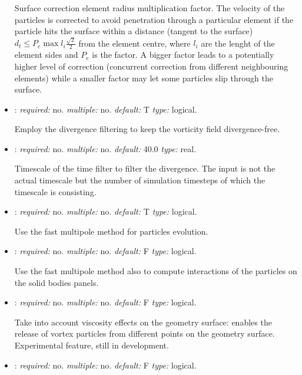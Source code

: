 \begin{itemize}
Surface correction element radius multiplication factor.
The velocity of the particles is corrected to avoid penetration through a 
particular element if the particle hits the surface within a distance 
(tangent to the surface) $d_t \leq P_e \max{l_i} \frac{\sqrt{2}}{2}$ 
from the element centre, where $l_i$ are the lenght of the element sides 
and $P_e$ is the factor. 
A bigger factor leads to a potentially higher level of correction 
(concurrent correction from different neighbouring elements) 
while a smaller factor may let some particles slip through the surface. 

\item {}: \textit{required:} no. \textit{multiple:} no. 
\textit{default:} T \textit{type:} logical.

Employ the divergence filtering to keep the vorticity field divergence-free. 

\item {}: \textit{required:} no. \textit{multiple:} no. 
\textit{default:} 40.0 \textit{type:} real.

Timescale of the time filter to filter the divergence. 
The input is not the actual timescale but the number of simulation timesteps 
of which the timescale is consisting. 

\item {}: \textit{required:} no. \textit{multiple:} no. \textit{default:} T 
\textit{type:} logical.

Use the fast multipole method for particles evolution.

\item {}: \textit{required:} no. \textit{multiple:} no. 
\textit{default:} F \textit{type:} logical.

Use the fast multipole method also to compute interactions 
of the particles on the solid bodies panels.

\item {}: \textit{required:} no. \textit{multiple:} no. 
\textit{default:} F \textit{type:} logical.

Take into account viscosity effects on the geometry surface: 
enables the release of vortex particles from different points 
on the geometry surface. Experimental feature, still in development.

\item {}: \textit{required:} no. 
\textit{multiple:} no. \textit{default:} F \textit{type:} logical.


\end{itemize}
